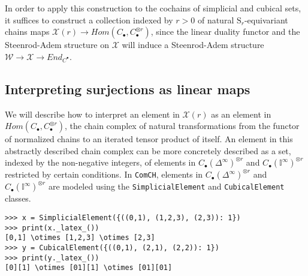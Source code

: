 \documentclass{amsart}
\renewcommand{\S}{\mathrm S}
\newcommand{\comch}{\texttt{ComCH}}
\newcommand{\X}{\mathcal X}
\begin{document}
In order to apply this construction to the cochains of simplicial and cubical sets, it suffices to construct a collection indexed by $r>0$ of natural $\S_r$-equivariant chains maps $\X(r) \to Hom(C_\bullet, C_\bullet^{\otimes r})$, since the linear duality functor and the Steenrod-Adem structure on $\X$ will induce a Steenrod-Adem structure $\mathcal W \to \X \to End_{C^\bullet}$.

\subsection{Interpreting surjections as linear maps}

We will describe how to interpret an element in $\X(r)$ as an element in $Hom(C_\bullet, C_\bullet^{\otimes r})$, the chain complex of natural transformations from the functor of normalized chains to an iterated tensor product of itself. An element in this abstractly described chain complex can be more concretely described as a set, indexed by the non-negative integers, of elements in $C_\bullet(\Delta^\infty)^{\otimes r}$ and $C_\bullet(\mathbb I^\infty)^{\otimes r}$ restricted by certain conditions. In \comch, elements in $C_\bullet(\Delta^\infty)^{\otimes r}$ and $C_\bullet(\mathbb I^\infty)^{\otimes r}$ are modeled using the \texttt{SimplicialElement} and \texttt{CubicalElement} classes.
\begin{Verbatim}[frame=single]
>>> x = SimplicialElement({((0,1), (1,2,3), (2,3)): 1})
>>> print(x._latex_())
[0,1] \otimes [1,2,3] \otimes [2,3]
>>> y = CubicalElement({((0,1), (2,1), (2,2)): 1})
>>> print(y._latex_())
[0][1] \otimes [01][1] \otimes [01][01]
\end{Verbatim}
\end{document}
